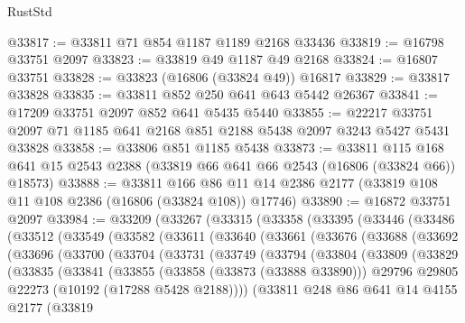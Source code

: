 \begin{lexlean}{RustStd}
\begin{coremodule}
@33817 := @33811 @71 @854 @1187 @1189 @2168 @33436
@33819 := @16798 @33751 @2097
@33823 := @33819 @49 @1187 @49 @2168
@33824 := @16807 @33751
@33828 := @33823 (@16806 (@33824 @49)) @16817
@33829 := @33817 @33828
@33835 := @33811 @852 @250 @641 @643 @5442 @26367
@33841 := @17209 @33751 @2097 @852 @641 @5435 @5440
@33855 := @22217 @33751 @2097 @71 @1185 @641 @2168 @851 @2188 @5438 @2097 @3243 @5427 @5431 @33828
@33858 := @33806 @851 @1185 @5438
@33873 := @33811
    @115
    @168
    @641
    @15
    @2543
    @2388
    (@33819 @66 @641 @66 @2543 (@16806 (@33824 @66)) @18573)
@33888 := @33811
    @166
    @86
    @11
    @14
    @2386
    @2177
    (@33819 @108 @11 @108 @2386 (@16806 (@33824 @108)) @17746)
@33890 := @16872 @33751 @2097
@33984 := @33209
    (@33267
      (@33315
        (@33358
          (@33395
            (@33446
              (@33486
                (@33512
                  (@33549
                    (@33582
                      (@33611
                        (@33640
                          (@33661
                            (@33676
                              (@33688
                                (@33692
                                  (@33696
                                    (@33700
                                      (@33704
                                        (@33731
                                          (@33749
                                            (@33794
                                              (@33804
                                                (@33809
                                                  (@33829
                                                    (@33835
                                                      (@33841
                                                        (@33855
                                                          (@33858 (@33873 (@33888 @33890)))
                                                          @29796
                                                          @29805
                                                          @22273
                                                          (@10192 (@17288 @5428 @2188))))
                                                      (@33811
                                                        @248
                                                        @86
                                                        @641
                                                        @14
                                                        @4155
                                                        @2177
                                                        (@33819

\end{coremodule}
\end{lexlean}
